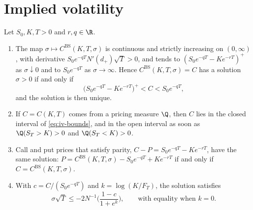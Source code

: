 
\section{Implied volatility}\label{sec:iv-implied}

\begin{proposition}\label{prop:iv-existence}
Let $S_0,K,T>0$ and $r,q\in\R$.
\begin{enumerate}[label=(\roman*)]
  \item The map $\sigma\mapsto C^{\mathrm{BS}}(K,T,\sigma)$ is continuous and strictly increasing on
    $(0,\infty)$, with derivative $S_0e^{-qT}N'(d_+)\sqrt T>0$, and tends to
    $(S_0e^{-qT}-Ke^{-rT})^+$ as $\sigma\downarrow0$ and to $S_0e^{-qT}$ as $\sigma\to\infty$. Hence
    $C^{\mathrm{BS}}(K,T,\sigma)=C$ has a solution $\sigma>0$ if and only if
    \begin{equation}\label{eq:iv-bounds}
      \big(S_0e^{-qT}-Ke^{-rT}\big)^+<C<S_0e^{-qT},
    \end{equation}
    and the solution is then unique.
  \item If $C=C(K,T)$ comes from a pricing measure $\Q$, then $C$ lies in the closed interval
    of \eqref{eq:iv-bounds}, and in the open interval as soon as $\Q(S_T>K)>0$ and $\Q(S_T<K)>0$.
  \item Call and put prices that satisfy parity, $C-P=S_0e^{-qT}-Ke^{-rT}$, have the same
    solution: $P=C^{\mathrm{BS}}(K,T,\sigma)-S_0e^{-qT}+Ke^{-rT}$ if and only if $C=C^{\mathrm{BS}}(K,T,\sigma)$.
  \item With $c=C/(S_0e^{-qT})$ and $k=\log(K/F_T)$, the solution satisfies
    \begin{equation}\label{eq:iv-upper}
      \sigma\sqrt T\le-2N^{-1}\Big(\frac{1-c}{1+e^k}\Big),\qquad\text{with equality when }k=0 .
    \end{equation}
\end{enumerate}
\end{proposition}


